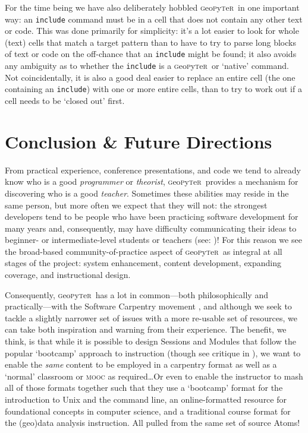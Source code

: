 \documentclass[letter, 11pt,titlepage]{article}
\newcommand{\gp}{\textsc{g}eo\textsc{p}y\textsc{t}e\textsc{r}~\/}
\begin{document}
For the time being we have also deliberately hobbled \gp in one important way: an \texttt{include} command must be in a cell that does not contain any other text or code. This was done primarily for simplicity: it's a lot easier to look for whole (text) cells that match a target pattern than to have to try to parse long blocks of text or code on the off-chance that an \texttt{include} might be found; it also avoids any ambiguity as to whether the \texttt{include} is a \gp or `native' command. Not coincidentally, it is also a good deal easier to replace an entire cell (the one containing an \texttt{include}) with one or more entire cells, than to try to work out if a cell needs to be `closed out' first.

\section{Conclusion \& Future Directions}\label{future}

From practical experience, conference presentations, and code we tend to already know who is a good \emph{programmer} or \emph{theorist}, \gp provides a mechanism for discovering who is a good \emph{teacher}. Sometimes these abilities may reside in the same person, but more often we expect that they will not: the strongest developers tend to be people who have been practicing software development for many years and, consequently, may have difficulty communicating their ideas to beginner- or intermediate-level students or teachers (see: \citealp{Chapman:2010aa})! For this reason we see the broad-based community-of-practice aspect of \gp as integral at all stages of the project: system enhancement, content development, expanding coverage, and instructional design.

Consequently, \gp has a lot in common---both philosophically and practically---with the Software Carpentry movement \citep{SCF2016}, and although we seek to tackle a slightly narrower set of issues with a more re-usable set of resources, we can take both inspiration and warning from their experience. The benefit, we think, is that while it is possible to design Sessions and Modules that follow the popular `bootcamp' approach to instruction (though see critique in \citealp{Feldon2017}), we want to enable the \emph{same} content to be employed in a carpentry format as well as a `normal' classroom or \textsc{mooc} as required\ldots Or even to enable the instructor to mash all of those formats together such that they use a `bootcamp' format for the introduction to Unix and the command line, an online-formatted resource for foundational concepts in computer science, and a traditional course format for the (geo)data analysis instruction. All pulled from the same set of source Atoms!
\end{document}
